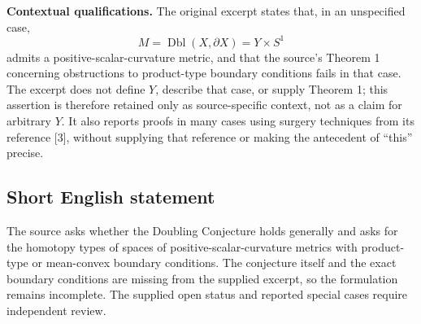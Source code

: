\documentclass[11pt]{article}
\begin{document}
\textbf{Contextual qualifications.} The original excerpt states that, in an unspecified case,
\[
M=\operatorname{Dbl}(X,\partial X)=Y\times S^1
\]
admits a positive-scalar-curvature metric, and that the source's Theorem 1 concerning obstructions to product-type boundary conditions fails in that case. The excerpt does not define \(Y\), describe that case, or supply Theorem 1; this assertion is therefore retained only as source-specific context, not as a claim for arbitrary \(Y\). It also reports proofs in many cases using surgery techniques from its reference [3], without supplying that reference or making the antecedent of ``this'' precise.
\subsection{Short English statement}
The source asks whether the Doubling Conjecture holds generally and asks for the homotopy types of spaces of positive-scalar-curvature metrics with product-type or mean-convex boundary conditions. The conjecture itself and the exact boundary conditions are missing from the supplied excerpt, so the formulation remains incomplete. The supplied open status and reported special cases require independent review.
\end{document}
